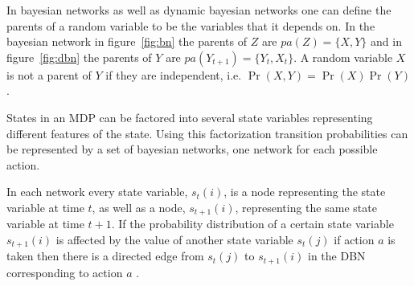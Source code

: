 In bayesian networks as well as dynamic bayesian networks one can define the
parents of a random variable to be the variables that it depends on. In the
bayesian network in figure~\ref{fig:bn} the parents of $Z$ are $pa(Z) = \{X,
Y\}$ and in figure~\ref{fig:dbn} the parents of $Y$ are $pa(Y_{t+1}) = \{Y_t,
X_t\}$. A random variable $X$ is not a parent of $Y$ if they are independent,
i.e. $\Pr(X, Y) = \Pr(X) \Pr(Y)$.

States in an MDP can be factored into several state variables representing
different features of the state. Using this factorization transition
probabilities can be represented by a set of bayesian networks, one network for
each possible action. 

In each network every state variable, $s_t(i)$, is a node representing the
state variable at time $t$, as well as a node, $s_{t+1}(i)$, representing the same state
variable at time $t+1$. If the probability distribution of a certain state
variable $s_{t+1}(i)$ is affected by the value of another state variable
$s_t(j)$ if action $a$ is taken then there is a directed edge from $s_t(j)$ to
$s_{t+1}(i)$ in the DBN corresponding to action $a$
\parencite{guestrin2003efficient}.
